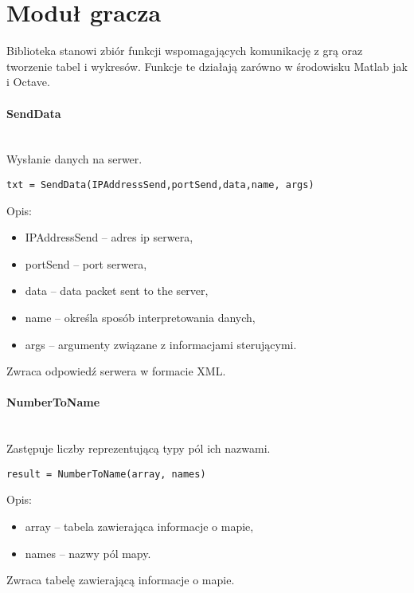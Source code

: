 \section{Moduł gracza}

Biblioteka stanowi zbiór funkcji wspomagających komunikację z grą oraz tworzenie tabel i wykresów. Funkcje te działają zarówno w środowisku Matlab jak i Octave.

\paragraph{SendData} \hspace{0pt} \\
Wysłanie danych na serwer.

\begin{lstlisting}[style=Matlab-editor]
txt = SendData(IPAddressSend,portSend,data,name, args)
\end{lstlisting}

Opis:
\begin{itemize}
\item  IPAddressSend -- adres ip serwera,
\item  portSend -- port serwera,
\item  data -- data packet sent to the server,
\item  name  -- określa sposób interpretowania danych,
\item  args  -- argumenty związane z informacjami sterującymi.
\end{itemize}

Zwraca odpowiedź serwera w formacie XML.

\paragraph{NumberToName} \hspace{0pt} \\
Zastępuje liczby reprezentującą typy pól ich nazwami.
\begin{lstlisting}[style=Matlab-editor]
result = NumberToName(array, names)
\end{lstlisting}

Opis:
\begin{itemize}
\item  array -- tabela zawierająca informacje o mapie,
\item  names -- nazwy pól mapy.
\end{itemize}

Zwraca tabelę zawierającą informacje o mapie.

